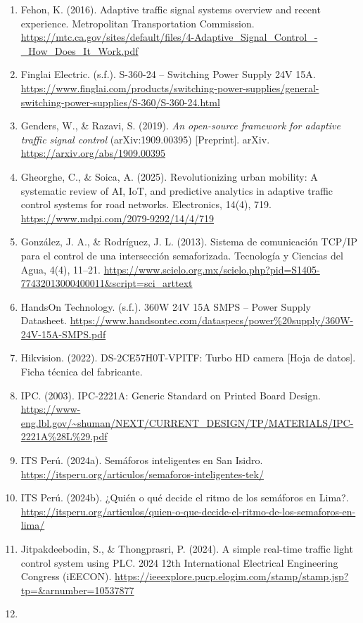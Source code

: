 \begin{enumerate}
\item
  Fehon, K. (2016). Adaptive traffic signal systems overview and recent experience. Metropolitan Transportation Commission. \url{https://mtc.ca.gov/sites/default/files/4-Adaptive_Signal_Control_-_How_Does_It_Work.pdf}
\item
  Finglai Electric. (s.f.). S-360-24 -- Switching Power Supply 24V 15A. \url{https://www.finglai.com/products/switching-power-supplies/general-switching-power-supplies/S-360/S-360-24.html}
\item
  Genders, W., \& Razavi, S. (2019). \emph{An open-source framework for adaptive traffic signal control} (arXiv:1909.00395) [Preprint]. arXiv. \url{https://arxiv.org/abs/1909.00395}
\item
  Gheorghe, C., \& Soica, A. (2025). Revolutionizing urban mobility: A systematic review of AI, IoT, and predictive analytics in adaptive traffic control systems for road networks. Electronics, 14(4), 719. \url{https://www.mdpi.com/2079-9292/14/4/719}
\item
  González, J. A., \& Rodríguez, J. L. (2013). Sistema de comunicación TCP/IP para el control de una intersección semaforizada. Tecnología y Ciencias del Agua, 4(4), 11--21. \url{https://www.scielo.org.mx/scielo.php?pid=S1405-77432013000400011&script=sci_arttext}
\item
  HandsOn Technology. (s.f.). 360W 24V 15A SMPS -- Power Supply Datasheet. \url{https://www.handsontec.com/dataspecs/power%20supply/360W-24V-15A-SMPS.pdf}
\item
  Hikvision. (2022). DS-2CE57H0T-VPITF: Turbo HD camera {[}Hoja de datos{]}. Ficha técnica del fabricante.
\item
  IPC. (2003). IPC-2221A: Generic Standard on Printed Board Design. \url{https://www-eng.lbl.gov/~shuman/NEXT/CURRENT_DESIGN/TP/MATERIALS/IPC-2221A%28L%29.pdf}
\item
  ITS Perú. (2024a). Semáforos inteligentes en San Isidro. \url{https://itsperu.org/articulos/semaforos-inteligentes-tek/}
\item
  ITS Perú. (2024b). ¿Quién o qué decide el ritmo de los semáforos en Lima?. \url{https://itsperu.org/articulos/quien-o-que-decide-el-ritmo-de-los-semaforos-en-lima/}
\item
  Jitpakdeebodin, S., \& Thongprasri, P. (2024). A simple real-time traffic light control system using PLC. 2024 12th International Electrical Engineering Congress (iEECON). \url{https://ieeexplore.pucp.elogim.com/stamp/stamp.jsp?tp=&arnumber=10537877}
\item

\end{enumerate}
